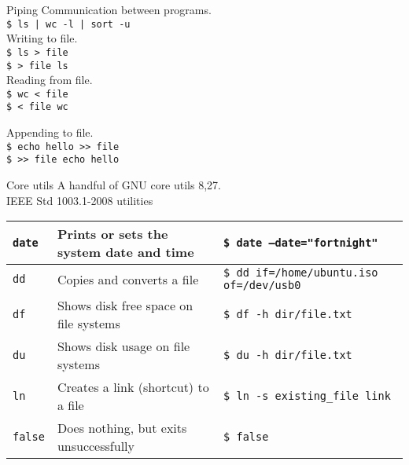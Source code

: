 \documentclass{beamer}
\let\tt\texttt
\begin{document}
\begin{frame}{Piping}
        Communication between programs.     \\
        \tt{\$ ls | wc -l | sort -u}        \\

        Writing to file.    \\
        \tt{\$ ls > file}   \\
        \tt{\$ > file ls}   \\

        Reading from file.    \\
        \tt{\$ wc < file}   \\
        \tt{\$ < file wc}
        
        Appending to file.    \\
        \tt{\$ echo hello >> file}   \\
        \tt{\$ >> file echo hello }
\end{frame}


\begin{frame}{Core utils}
        A handful of GNU core utils 8,27. \\
        IEEE Std 1003.1-2008 utilities \\
        \begin{tabular}{p{} p{} | p{}}
                \hline
                \tt{date}             &
                Prints or sets the system date and time &
                \tt{\$ date --date="fortnight"}       \\
                \hline
                \tt{dd}             &
                Copies and converts a file  &
                \tt{\$ dd if=/home/ubuntu.iso of=/dev/usb0}       \\
                \hline
                \tt{df}             &
                Shows disk free space on file systems   &
                \tt{\$ df -h dir/file.txt}       \\
                \hline
                \tt{du}             &
                Shows disk usage on file systems &
                \tt{\$ du -h dir/file.txt}       \\
                \hline
                \tt{ln}             &
                Creates a link (shortcut) to a file &
                \tt{\$ ln -s existing\_file link}       \\
                \hline
                \tt{false}             &
                Does nothing, but exits unsuccessfully &
                \tt{\$ false}       \\
                \hline
        \end{tabular}
\end{frame}
\end{document}
